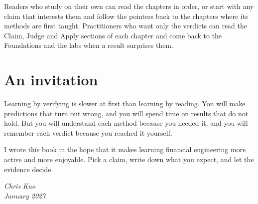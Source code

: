 Readers who study on their own can read the chapters in order, or start with any claim that interests them and follow the pointers back to the chapters where its methods are first taught. Practitioners who want only the verdicts can read the Claim, Judge and Apply sections of each chapter and come back to the Foundations and the labs when a result surprises them.


\section*{An invitation}

Learning by verifying is slower at first than learning by reading. You will make predictions that turn out wrong, and you will spend time on results that do not hold. But you will understand each method because you needed it, and you will remember each verdict because you reached it yourself.

I wrote this book in the hope that it makes learning financial engineering more active and more enjoyable. Pick a claim, write down what you expect, and let the evidence decide.

\bigskip
\begin{flushright}
\emph{Chris Kuo}\\
\emph{January 2027}
\end{flushright}
